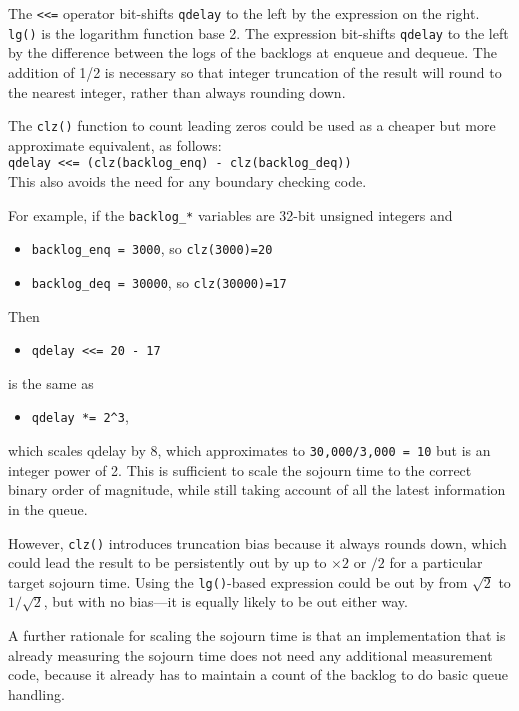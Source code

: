 The \texttt{<<=} operator bit-shifts \texttt{qdelay} to the left by the expression on the right. \texttt{lg()} is the logarithm function base 2. The expression bit-shifts \texttt{qdelay} to the left by the difference between the logs of the backlogs at enqueue and dequeue. The addition of 1/2 is necessary so that integer truncation of the result will round to the nearest integer, rather than always rounding down. 

The \texttt{clz()} function to count leading zeros could be used as a cheaper but more approximate equivalent, as follows:\\
{\small\texttt{qdelay <<= (clz(backlog\_enq) - clz(backlog\_deq))}}\\
This also avoids the need for any boundary checking code.

For example, if the \texttt{backlog\_*} variables are 32-bit unsigned integers and
\begin{itemize}[nosep]
	\item[] \texttt{backlog\_enq = 3000}, so \texttt{clz(3000)=20}
	\item[] \texttt{backlog\_deq = 30000}, so \texttt{clz(30000)=17}
\end{itemize}
Then
\begin{itemize}[nosep]
	\item[] \texttt{qdelay <<= 20 - 17}
\end{itemize}
is the same as
\begin{itemize}[nosep]
    \item[] \texttt{qdelay *= 2\^{}3},\\
\end{itemize}
which scales qdelay by 8, which approximates to \texttt{30,000/3,000 = 10} but is an integer power of 2. This is sufficient to scale the sojourn time to the correct binary order of magnitude, while still taking account of all the latest information in the queue.

However, \texttt{clz()} introduces truncation bias because it always rounds down, which could lead the result to be persistently out by up to \(\times2\) or \(/2\) for a particular target sojourn time. Using the \texttt{lg()}-based expression could be out by from \(\sqrt{2}\) to \(1/\sqrt{2}\), but with no bias---it is equally likely to be out either way.

A further rationale for scaling the sojourn time is that an implementation that is already measuring the sojourn time does not need any additional measurement code, because it already has to maintain a count of the backlog to do basic queue handling.

